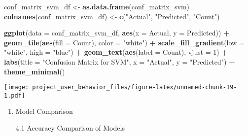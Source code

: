 \documentclass[
]{article}
\newenvironment{Shaded}{\begin{snugshade}}{\end{snugshade}}
\newcommand{\AttributeTok}[1]{\textcolor[rgb]{0.13,0.29,0.53}{#1}}
\newcommand{\DecValTok}[1]{\textcolor[rgb]{0.00,0.00,0.81}{#1}}
\newcommand{\FunctionTok}[1]{\textcolor[rgb]{0.13,0.29,0.53}{\textbf{#1}}}
\newcommand{\NormalTok}[1]{#1}
\newcommand{\OtherTok}[1]{\textcolor[rgb]{0.56,0.35,0.01}{#1}}
\newcommand{\SpecialCharTok}[1]{\textcolor[rgb]{0.81,0.36,0.00}{\textbf{#1}}}
\newcommand{\StringTok}[1]{\textcolor[rgb]{0.31,0.60,0.02}{#1}}
\providecommand{\tightlist}{%
  \setlength{\itemsep}{0pt}\setlength{\parskip}{0pt}}
\begin{document}
\begin{Shaded}
\begin{Highlighting}[]
\NormalTok{conf\_matrix\_svm\_df }\OtherTok{\textless{}{-}} \FunctionTok{as.data.frame}\NormalTok{(conf\_matrix\_svm)}
\FunctionTok{colnames}\NormalTok{(conf\_matrix\_svm\_df) }\OtherTok{\textless{}{-}} \FunctionTok{c}\NormalTok{(}\StringTok{"Actual"}\NormalTok{, }\StringTok{"Predicted"}\NormalTok{, }\StringTok{"Count"}\NormalTok{)}

\FunctionTok{ggplot}\NormalTok{(}\AttributeTok{data =}\NormalTok{ conf\_matrix\_svm\_df, }\FunctionTok{aes}\NormalTok{(}\AttributeTok{x =}\NormalTok{ Actual, }\AttributeTok{y =}\NormalTok{ Predicted)) }\SpecialCharTok{+}
  \FunctionTok{geom\_tile}\NormalTok{(}\FunctionTok{aes}\NormalTok{(}\AttributeTok{fill =}\NormalTok{ Count), }\AttributeTok{color =} \StringTok{"white"}\NormalTok{) }\SpecialCharTok{+}
  \FunctionTok{scale\_fill\_gradient}\NormalTok{(}\AttributeTok{low =} \StringTok{"white"}\NormalTok{, }\AttributeTok{high =} \StringTok{"blue"}\NormalTok{) }\SpecialCharTok{+}
  \FunctionTok{geom\_text}\NormalTok{(}\FunctionTok{aes}\NormalTok{(}\AttributeTok{label =}\NormalTok{ Count), }\AttributeTok{vjust =} \DecValTok{1}\NormalTok{) }\SpecialCharTok{+}
  \FunctionTok{labs}\NormalTok{(}\AttributeTok{title =} \StringTok{"Confusion Matrix for SVM"}\NormalTok{, }\AttributeTok{x =} \StringTok{"Actual"}\NormalTok{, }\AttributeTok{y =} \StringTok{"Predicted"}\NormalTok{) }\SpecialCharTok{+}
  \FunctionTok{theme\_minimal}\NormalTok{()}
\end{Highlighting}
\end{Shaded}

\texttt{[image: project\_user\_behavior\_files/figure-latex/unnamed-chunk-19-1.pdf]}

\begin{enumerate}
\def\labelenumi{\arabic{enumi}.}
\setcounter{enumi}{3}
\tightlist
\item
  Model Comparison

  4.1 Accuracy Comparison of Models
\end{enumerate}
\end{document}
